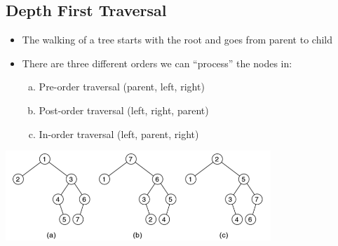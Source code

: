 \documentclass[10pt]{article}
\begin{document}
\subsection*{Depth First Traversal}
\begin{itemize}
    \item The walking of a tree starts with the root and goes from parent to child
    \item There are three different orders we can ``process'' the nodes in:
    \begin{enumerate}[(a)]
        \item Pre-order traversal (parent, left, right)
        \item Post-order traversal (left, right, parent)
        \item In-order traversal (left, parent, right)
    \end{enumerate}
\end{itemize}
\begin{center}
    \includegraphics[width=0.75\textwidth]{images/3.png}
\end{center}
\end{document}
